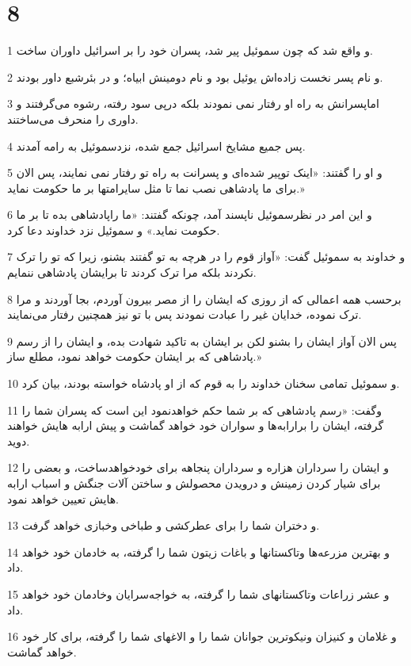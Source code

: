 \chapter{8}

\par 1 و واقع شد که چون سموئیل پیر شد، پسران خود را بر اسرائیل داوران ساخت.
\par 2 و نام پسر نخست زاده‌اش یوئیل بود و نام دومینش ابیاه؛ و در بئرشبع داور بودند.
\par 3 اماپسرانش به راه او رفتار نمی نمودند بلکه در‌پی سود رفته، رشوه می‌گرفتند و داوری را منحرف می‌ساختند.
\par 4 پس جمیع مشایخ اسرائیل جمع شده، نزدسموئیل به رامه آمدند.
\par 5 و او را گفتند: «اینک توپیر شده‌ای و پسرانت به راه تو رفتار نمی نمایند، پس الان برای ما پادشاهی نصب نما تا مثل سایرامتها بر ما حکومت نماید.»
\par 6 و این امر در نظرسموئیل ناپسند آمد، چونکه گفتند: «ما راپادشاهی بده تا بر ما حکومت نماید.» و سموئیل نزد خداوند دعا کرد.
\par 7 و خداوند به سموئیل گفت: «آواز قوم را در هر‌چه به تو گفتند بشنو، زیرا که تو را ترک نکردند بلکه مرا ترک کردند تا برایشان پادشاهی ننمایم.
\par 8 بر‌حسب همه اعمالی که از روزی که ایشان را از مصر بیرون آوردم، بجا آوردند و مرا ترک نموده، خدایان غیر را عبادت نمودند پس با تو نیز همچنین رفتار می‌نمایند.
\par 9 پس الان آواز ایشان را بشنو لکن بر ایشان به تاکید شهادت بده، و ایشان را از رسم پادشاهی که بر ایشان حکومت خواهد نمود، مطلع ساز.»
\par 10 و سموئیل تمامی سخنان خداوند را به قوم که از او پادشاه خواسته بودند، بیان کرد.
\par 11 وگفت: «رسم پادشاهی که بر شما حکم خواهدنمود این است که پسران شما را گرفته، ایشان را برارابه‌ها و سواران خود خواهد گماشت و پیش ارابه هایش خواهند دوید.
\par 12 و ایشان را سرداران هزاره و سرداران پنجاهه برای خودخواهدساخت، و بعضی را برای شیار کردن زمینش و درویدن محصولش و ساختن آلات جنگش و اسباب ارابه هایش تعیین خواهد نمود.
\par 13 و دختران شما را برای عطرکشی و طباخی وخبازی خواهد گرفت.
\par 14 و بهترین مزرعه‌ها وتاکستانها و باغات زیتون شما را گرفته، به خادمان خود خواهد داد.
\par 15 و عشر زراعات وتاکستانهای شما را گرفته، به خواجه‌سرایان وخادمان خود خواهد داد.
\par 16 و غلامان و کنیزان ونیکوترین جوانان شما را و الاغهای شما را گرفته، برای کار خود خواهد گماشت.
